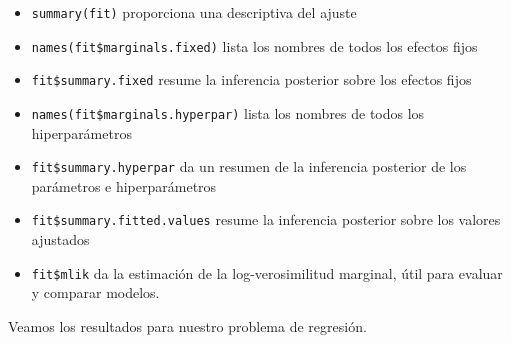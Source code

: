 \documentclass[
]{book}
\providecommand{\tightlist}{%
  \setlength{\itemsep}{0pt}\setlength{\parskip}{0pt}}
\begin{document}
\begin{itemize}
\tightlist
\item
  \texttt{summary(fit)} proporciona una descriptiva del ajuste
\item
  \texttt{names(fit\$marginals.fixed)} lista los nombres de todos los efectos fijos
\item
  \texttt{fit\$summary.fixed} resume la inferencia posterior sobre los efectos fijos
\item
  \texttt{names(fit\$marginals.hyperpar)} lista los nombres de todos los hiperparámetros
\item
  \texttt{fit\$summary.hyperpar} da un resumen de la inferencia posterior de
  los parámetros e hiperparámetros
\item
  \texttt{fit\$summary.fitted.values} resume la inferencia posterior sobre los valores ajustados
\item
  \texttt{fit\$mlik} da la estimación de la log-verosimilitud marginal, útil para evaluar y comparar modelos.
\end{itemize}

Veamos los resultados para nuestro problema de regresión.
\end{document}
